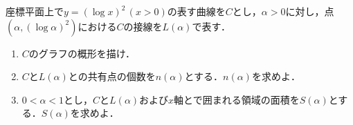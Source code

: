 \documentclass[../../main.tex]{subfiles}
\begin{document}
座標平面上で$y = (\log x)^2 \, (x>0)$の表す曲線を$C$とし，$\alpha > 0$に対し，点$(\alpha, (\log \alpha)^2)$における$C$の接線を$L(\alpha)$で表す．
\begin{enumerate}
  \item $C$のグラフの概形を描け．
  \item $C$と$L(\alpha)$との共有点の個数を$n(\alpha)$とする．$n(\alpha)$を求めよ．
  \item $0 < \alpha < 1$とし，$C$と$L(\alpha)$および$x$軸とで囲まれる領域の面積を$S(\alpha)$とする．$S(\alpha)$を求めよ．
\end{enumerate}
\end{document}
